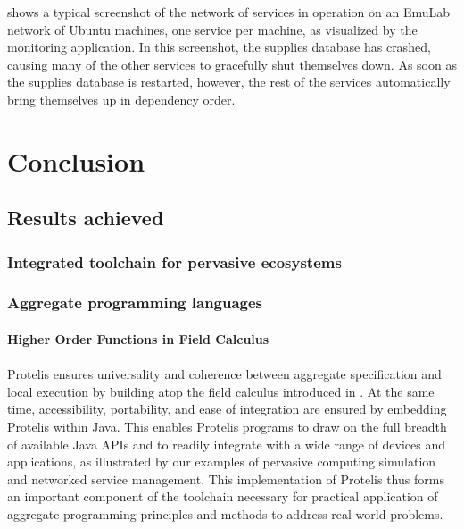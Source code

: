 \documentclass[12pt,a4paper,twoside,openright]{book}
\begin{document}
 shows a typical screenshot of the network of services in operation on an EmuLab network of Ubuntu machines, one service per machine, as visualized by the monitoring application.
%
In this screenshot, the supplies database has crashed, causing many of the other services to gracefully shut themselves down.  As soon as the supplies database is restarted, however, the rest of the services automatically bring themselves up in dependency order.

\part{Conclusion}
\chapter{Results achieved}

\section{Integrated toolchain for pervasive ecosystems}

\section{Aggregate programming languages}


\subsection{Higher Order Functions in Field Calculus}

\subsection{\protelis{}}
Protelis ensures universality and coherence between aggregate specification and local execution by building atop the field calculus introduced in \cite{VDB-FOCLASA-CIC2013}.
%
At the same time, accessibility, portability, and ease of integration are ensured by embedding Protelis within Java.
%
This enables Protelis programs to draw on the full breadth of available Java APIs and to readily integrate with a wide range of devices and applications, as illustrated by our examples of pervasive computing simulation and networked service management.
%
This implementation of Protelis thus forms an important component of the toolchain necessary for practical application of aggregate programming principles and methods to address real-world problems.
%
\end{document}
